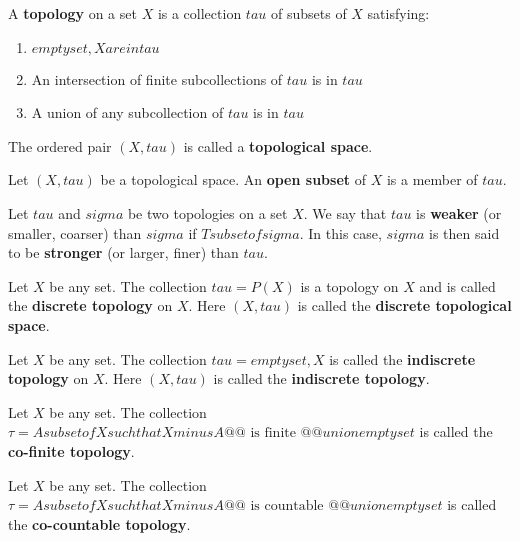 \begin{defn}
A \textbf{topology} on a set $X$ is a collection $tau$ of subsets of $X$ satisfying:
    \begin{enumerate}
        \item $empty set, X are in tau$
        \item  An intersection of finite subcollections of $tau$ is in $tau$
        \item A union of any subcollection of $tau$ is in $tau$
    \end{enumerate}
The ordered pair $(X, tau)$ is called a \textbf{topological space}.
\end{defn}


\begin{defn}
    Let $(X, tau)$ be a topological space. An \textbf{open subset} of $X$ is a member of $tau$.
\end{defn}

\begin{defn}
Let $tau$ and $sigma$ be two topologies on a set $X$. We say that $tau$ is \textbf{weaker} (or smaller, coarser) than $sigma$ if $T subset of sigma$. In this case, $sigma$ is then said to be \textbf{stronger} (or larger, finer) than $tau$.
\end{defn}

\begin{defn}
Let $X$ be any set. The collection $tau = P(X)$ is a topology on $X$ and is called the \textbf{discrete topology} on $X$. Here $(X, tau)$ is called the \textbf{discrete topological space}.
\end{defn}

\begin{defn}
Let $X$ be any set. The collection $tau = {{ empty set, X }}$ is called the \textbf{indiscrete topology} on $X$. Here $(X, tau)$ is called the \textbf{indiscrete topology}.
\end{defn}

\begin{defn}
    Let $X$ be any set. The collection $\tau = {{ A subset of X such that X minus A @@\text{ is finite }@@ }} union {{ empty set }}$ is called the \textbf{co-finite topology}.
\end{defn}

\begin{defn}
    Let $X$ be any set. The collection $\tau = {{ A subset of X such that X minus A @@\text{ is countable }@@ }} union {{ empty set }}$ is called the \textbf{co-countable topology}.
\end{defn}



